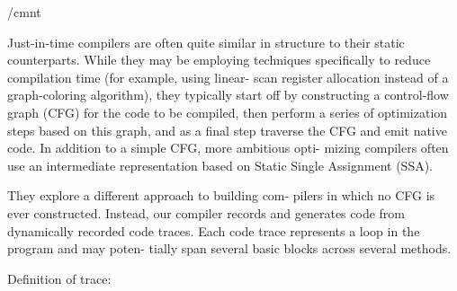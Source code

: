 /cmnt{
Just-in-time compilers are often quite similar in structure to their
static counterparts. While they may be employing techniques
specifically to reduce compilation time 
(for example, using linear-
scan register allocation instead of a graph-coloring algorithm), 
they
typically start off by constructing a control-flow graph (CFG) for
the code to be compiled, then perform a series of optimization steps
based on this graph, and as a final step traverse the CFG and emit
native code. 
In addition to a simple CFG, more ambitious opti-
mizing compilers often use an intermediate representation based
on Static Single Assignment (SSA). 

They explore a different approach to building com-
pilers in which no CFG is ever constructed. Instead, our compiler
records and generates code from dynamically recorded code traces.
Each code trace represents a loop in the program and may poten-
tially span several basic blocks across several methods.

Definition of trace:
}
